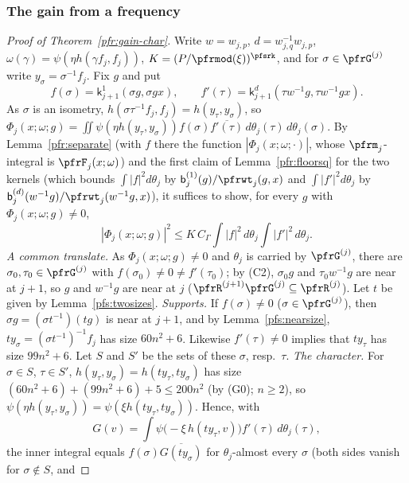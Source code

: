 \documentclass[10pt]{amsart}
\theoremstyle{definition}
\theoremstyle{remark}
\begin{document}
\subsubsection*{The gain from a frequency}
\begin{proof}[Proof of Theorem~\ref{pfr:gain-char}]
Write $w=w_{j,p}$, $d=w_{j,q}^{-1}w_{j,p}$, $\omega(\gamma)=\psi(\eta h(\gamma f_j,f_j))$, $K=(P/\pfrmod(\xi))^{\pfsrk}$, and for
$\sigma\in\pfrG^{(j)}$ write $y_\sigma=\sigma^{-1}f_j$. Fix $g$ and put
\[
f(\sigma)=\mathsf k^1_{j+1}(\sigma g,\sigma gx),\qquad f'(\tau)=\mathsf k^d_{j+1}(\tau w^{-1}g,\tau w^{-1}gx).
\]
As $\sigma$ is an isometry, $h(\sigma\tau^{-1}f_j,f_j)=h(y_\tau,y_\sigma)$, so $\Phi_j(x;\omega;g)=\iint\psi(\eta h(y_\tau,y_\sigma))f(\sigma)
\overline{f'(\tau)}\,d\theta_j(\tau)\,d\theta_j(\sigma)$. By Lemma~\ref{pfr:separate} (with $f$ there the function $|\Phi_j(x;\omega;\cdot)|$,
whose $\pfrm_j$-integral is $\pfrF_j(x;\omega)$) and the first claim of Lemma~\ref{pfr:floorsq} for the two kernels (which bounds
$\int|f|^2d\theta_j$ by $\mathsf b^{(1)}_j(g)/\pfrwt_j(g,x)$ and $\int|f'|^2d\theta_j$ by $\mathsf b^{(d)}_j(w^{-1}g)/\pfrwt_j(w^{-1}g,x)$), it suffices to
show, for every $g$ with $\Phi_j(x;\omega;g)\ne0$,
\begin{equation}\label{pfs:eq-char}
|\Phi_j(x;\omega;g)|^2\le K\,C_\Gamma\int|f|^2\,d\theta_j\int|f'|^2\,d\theta_j .
\end{equation}
\emph{A common translate.} As $\Phi_j(x;\omega;g)\ne0$ and $\theta_j$ is carried by $\pfrG^{(j)}$, there are $\sigma_0,\tau_0\in\pfrG^{(j)}$
with $f(\sigma_0)\ne0\ne f'(\tau_0)$; by (C2), $\sigma_0g$ and $\tau_0w^{-1}g$ are near at $j+1$, so $g$ and $w^{-1}g$ are near at $j$
($\pfrR^{(j+1)}\pfrG^{(j)}\subseteq\pfrR^{(j)}$). Let $t$ be given by Lemma~\ref{pfs:twosizes}. \emph{Supports.} If $f(\sigma)\ne0$ ($\sigma\in
\pfrG^{(j)}$), then $\sigma g=(\sigma t^{-1})(tg)$ is near at $j+1$, and by Lemma~\ref{pfs:nearsize}, $ty_\sigma=(\sigma t^{-1})^{-1}f_j$ has size
$60n^2+6$. Likewise $f'(\tau)\ne0$ implies that $ty_\tau$ has size $99n^2+6$. Let $S$ and $S'$ be the sets of these $\sigma$, resp.\ $\tau$.
\emph{The character.} For $\sigma\in S$, $\tau\in S'$, $h(y_\tau,y_\sigma)=h(ty_\tau,ty_\sigma)$ has size $(60n^2+6)+(99n^2+6)+5\le200n^2$ (by
(G0); $n\ge2$), so $\psi(\eta h(y_\tau,y_\sigma))=\psi(\xi h(ty_\tau,ty_\sigma))$. Hence, with
\[
G(v)=\int\psi\bigl(-\xi\,h(ty_\tau,v)\bigr)f'(\tau)\,d\theta_j(\tau),
\]
the inner integral equals $f(\sigma)\overline{G(ty_\sigma)}$ for $\theta_j$-almost every $\sigma$ (both sides vanish for $\sigma\notin S$, and

\end{proof}
\end{document}
